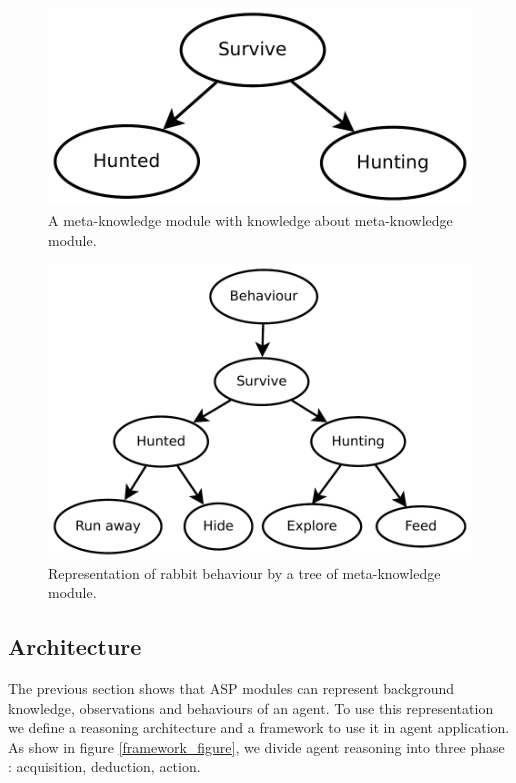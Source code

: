 \documentclass{aamas2012}
\begin{document}
	\begin{figure}
		\centering
		\includegraphics[keepaspectratio=true, scale=0.4]{survive.pdf}
		\caption
		{
			\label{survive_figure}
			A meta-knowledge module with knowledge about meta-knowledge module.
		}
	\end{figure}
	
	\begin{figure}
		\centering
		\includegraphics[keepaspectratio=true, scale=0.5]{behaviour_tree.pdf}
		\caption
		{
			\label{behaviour_tree}
			Representation of rabbit behaviour by a tree of meta-knowledge module.
		}
	\end{figure}
	
\subsection{Architecture}

	The previous section shows that ASP modules can represent background knowledge, observations and behaviours of an agent.
	To use this representation we define a reasoning architecture and a framework to use it in agent application.
	As show in figure \ref{framework_figure}, we divide agent reasoning into three phase : acquisition, deduction, action.
	
\end{document}
